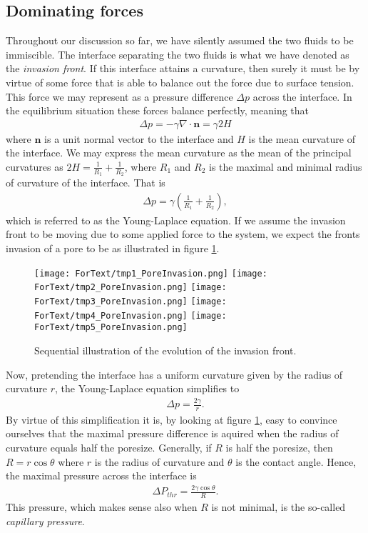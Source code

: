 \documentclass[twoside,utf8]{article}
\newcommand{\EQU}[1] { \begin{equation*} \begin{split} #1 \end{split} \end{equation*} }
\newcommand{\EQUn}[1] { \begin{equation} \begin{split} #1 \end{split} \end{equation} }
\begin{document}
\subsection{Dominating forces }
Throughout our discussion so far, we have silently assumed the two fluids to be immiscible. The interface separating the two fluids is what we have denoted as the {\it invasion front}. If this interface attains a curvature, then surely it must be by virtue of some force that is able to balance out the force due to surface tension. This force we may represent as a pressure difference $\Delta p$ across the interface. In the equilibrium situation these forces balance perfectly, meaning that
\EQU{
\Delta p = -\gamma \nabla \cdot \mathbf{n} = \gamma 2H
}
where $\mathbf{n}$ is a unit normal vector to the interface and $H$ is the mean curvature of the interface. We may express the mean curvature as the mean of the principal curvatures as $2H=\frac{1}{R_1}+\frac{1}{R_2}$, where $R_1$ and $R_2$ is the maximal and minimal radius of curvature of the interface. That is
\EQUn{
\Delta p = \gamma \left( \frac{1}{R_1} + \frac{1}{R_2} \right), \label{eq:YoungLaplace}
}
which is referred to as the Young-Laplace equation. If we assume the invasion front to be moving due to some applied force to the system, we expect the fronts invasion of a pore to be as illustrated in figure \ref{fig:poreInvasion}.

\begin{figure}[H]
	\begin{center}
	\texttt{[image: ForText/tmp1\_PoreInvasion.png]}
	\texttt{[image: ForText/tmp2\_PoreInvasion.png]}
	\texttt{[image: ForText/tmp3\_PoreInvasion.png]}
	\texttt{[image: ForText/tmp4\_PoreInvasion.png]}
	\texttt{[image: ForText/tmp5\_PoreInvasion.png]}
	\end{center}
	\caption{Sequential illustration of the evolution of the invasion front. }
	\label{fig:poreInvasion}
\end{figure}

\noindent
Now, pretending the interface has a uniform curvature given by the radius of curvature $r$, the Young-Laplace equation simplifies to
\EQU{
\Delta p = \frac{2\gamma}{r}.
}
By virtue of this simplification it is, by looking at figure \ref{fig:poreInvasion}, easy to convince ourselves that the maximal pressure difference is aquired when the radius of curvature equals half the poresize. Generally, if $R$ is half the poresize, then $R=r\cos \theta$ where $r$ is the radius of curvature and $\theta$ is the contact angle. Hence, the maximal pressure across the interface is
\EQUn{
\Delta P_{thr} = \frac{2 \gamma \cos \theta}{R}. \label{eq:CapillaryP}
}
This pressure, which makes sense also when $R$ is not minimal, is the so-called {\it capillary pressure}.
\end{document}
